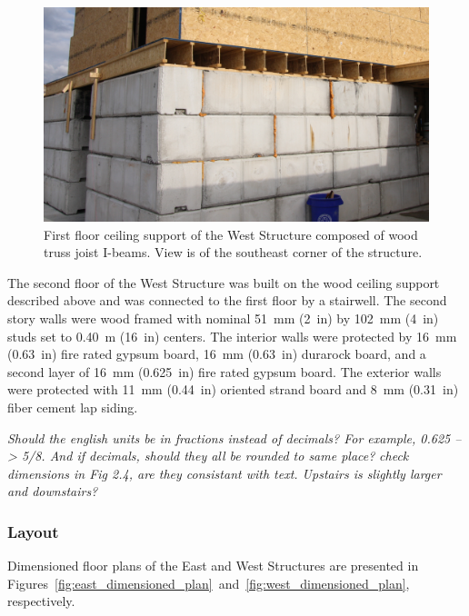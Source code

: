 \documentclass[12pt,oneside]{book}
\begin{document}
\begin{figure}[!ht]
	\includegraphics[width=\columnwidth]{../Figures/Pictures/TJI_support}
	\caption[TJI-constructed ceiling support of the West Structure.]{First floor ceiling support of the West Structure composed of wood truss joist I-beams. View is of the southeast corner of the structure.}
	\label{fig:TJI}
\end{figure}
\FloatBarrier

The second floor of the West Structure was built on the wood ceiling support described above and was connected to the first floor by a stairwell. The second story walls were wood framed with nominal 51~mm (2~in) by 102~mm (4~in) studs set to 0.40~m (16~in) centers. The interior walls were protected by 16~mm (0.63~in) fire rated gypsum board, 16~mm (0.63~in) durarock board, and a second layer of 16~mm (0.625~in) fire rated gypsum board. The exterior walls were protected with 11~mm (0.44~in) oriented strand board and 8~mm (0.31~in) fiber cement lap siding.

\textit{Should the english units be in fractions instead of decimals? For example, 0.625 --> 5/8. And if decimals, should they all be rounded to same place?}
\textit{check dimensions in Fig 2.4, are they consistant with text.  Upstairs is slightly larger and downstairs?}

\subsubsection{Layout}
\label{sec:layout}
Dimensioned floor plans of the East and West Structures are presented in Figures~\ref{fig:east_dimensioned_plan}~and~\ref{fig:west_dimensioned_plan}, respectively.
\end{document}
